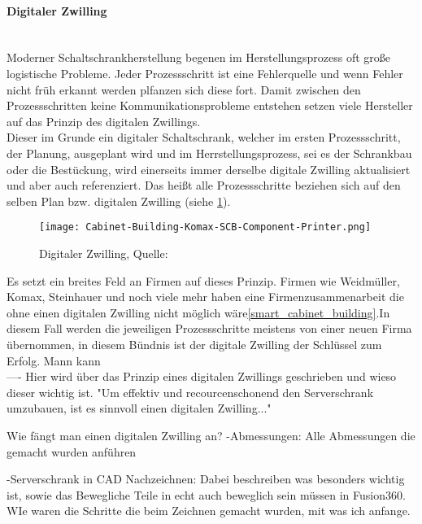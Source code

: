     \paragraph{Digitaler Zwilling}\mbox{}\\
    Moderner Schaltschrankherstellung begenen im Herstellungsprozess oft große logistische Probleme. Jeder Prozessschritt ist eine Fehlerquelle und wenn Fehler nicht früh erkannt werden plfanzen sich diese fort. Damit zwischen den Prozessschritten keine Kommunikationsprobleme entstehen setzen viele Hersteller auf das Prinzip des digitalen Zwillings.\\
    Dieser im Grunde ein digitaler Schaltschrank, welcher im ersten Prozessschritt, der Planung, ausgeplant wird und im Herrstellungsprozess, sei es der Schrankbau oder die Bestückung, wird einerseits immer derselbe digitale Zwilling aktualisiert und aber auch referenziert. Das heißt alle Prozessschritte beziehen sich auf den selben Plan bzw. digitalen Zwilling (siehe \ref{fig:digilaerZwilling}).\\

    \begin{figure}[H]
        \centering
        \texttt{[image: Cabinet-Building-Komax-SCB-Component-Printer.png]}
        \caption{Digitaler Zwilling, Quelle: \cite{digitaler_zwilling_bild}}
        \label{fig:digilaerZwilling}
    \end{figure}
    
    Es setzt ein breites Feld an Firmen auf dieses Prinzip. Firmen wie Weidmüller, Komax, Steinhauer und noch viele mehr haben eine Firmenzusammenarbeit die ohne einen digitalen Zwilling nicht möglich wäre\ref{smart_cabinet_building}.In diesem Fall werden die jeweiligen Prozessschritte meistens von einer neuen Firma übernommen, in diesem Bündnis ist der digitale Zwilling der Schlüssel zum Erfolg. Mann kann \\

    ----
    Hier wird über das Prinzip eines digitalen Zwillings geschrieben und wieso dieser wichtig ist. "Um effektiv und recourcenschonend den Serverschrank umzubauen, ist es sinnvoll einen digitalen Zwilling..." 
    
    Wie fängt man einen digitalen Zwilling an?
    -Abmessungen: Alle Abmessungen die gemacht wurden anführen

    -Serverschrank in CAD Nachzeichnen: Dabei beschreiben was besonders wichtig ist, sowie das Bewegliche Teile in echt auch beweglich sein müssen in Fusion360. WIe waren die Schritte die beim Zeichnen gemacht wurden, mit was ich anfange.

